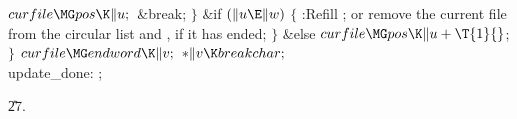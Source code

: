${}\\{curfile}\MG\\{pos}\K\|u;{}$\6
\&{break};\6
\4${}\}{}$\2\6
\&{if} ${}(\|u\E\|w){}$\5
${}\{{}$\1\6
:Refill ; or remove the current file from the
circular list and , if it has ended\X;\6
\4${}\}{}$\2\6
\&{else}\1\5
${}\\{curfile}\MG\\{pos}\K\|u+\T{1}{}$;\2\6
\4${}\}{}$\2\6
${}\\{curfile}\MG\\{endword}\K\|v;{}$\6
${}{*}\|v\K\\{breakchar};{}$\6
\4\\{update\_done}:\5
;\par
\U27.\fi

